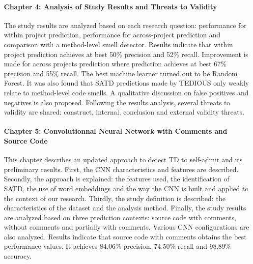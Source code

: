 \paragraph{Chapter 4: Analysis of Study Results and Threats to Validity}
The study results are analyzed based on each research question: performance for within project prediction, performance for across-project prediction and comparison with a method-level smell detector. Results indicate that within project prediction achieves at best 50\% precision and 52\% recall. Improvement is made for across projects prediction where prediction achieves at best 67\% precision and 55\% recall. The best machine learner turned out to be Random Forest. It was also found that \ac{SATD} predictions made by \ac{TEDIOUS} only weakly relate to method-level code smells. A qualitative discussion on false positives and negatives is also proposed. Following the results analysis, several threats to validity are shared: construct, internal, conclusion and external validity threats.

\paragraph{Chapter 5: Convolutionnal Neural Network with Comments and Source Code} This chapter describes an updated approach to detect \ac{TD} to self-admit and its preliminary results. First, the \ac{CNN} characteristics and features are described. Secondly, the approach is explained: the features used, the identification of \ac{SATD}, the use of word embeddings and the way the \ac{CNN} is built and applied to the context of our research. Thirdly, the study definition is described: the characteristics of the dataset and the analysis method. Finally, the study results are analyzed based on three prediction contexts: source code with comments, without comments and partially with comments. Various \ac{CNN} configurations are also analyzed. Results indicate that source code with comments obtains the best performance values. It achieves 84.06\% precision, 74.50\% recall and 98.89\% accuracy.









